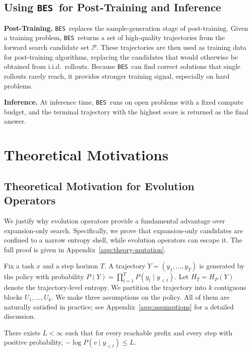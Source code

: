 \documentclass{llmxive}
\providecommand{\ours}{\texttt{BES}}
\begin{document}
\subsection{Using \ours\ for Post-Training and Inference}
\label{sec:usage}

\textbf{Post-Training.}
\ours\ replaces the sample-generation stage of post-training. Given a training problem, \ours\ returns a set of high-quality trajectories from the forward search candidate set $\mathcal{P}$. These trajectories are then used as training data for post-training algorithms, replacing the candidates that would otherwise be obtained from i.i.d.\ rollouts.
Because \ours\ can find correct solutions that single rollouts
rarely reach, it provides stronger training signal, especially
on hard problems.

\textbf{Inference.}
At inference time, \ours\ runs on open problems with a
fixed compute budget, and the terminal trajectory with the
highest score is returned as the final answer. 
\section{Theoretical Motivations}

\subsection{Theoretical Motivation for Evolution Operators}
\label{sec:theory-mutation}

We justify why evolution operators provide a fundamental advantage over expansion-only search. Specifically, we prove that expansion-only candidates are confined to a narrow entropy shell, while evolution operators can escape it. The full proof is given in Appendix~\ref{app:theory-mutation}.

Fix a task $x$ and a step horizon $T$. A trajectory $Y = (y_1, \dots, y_T)$ is generated by the policy with probability $P(Y) = \prod_{t=1}^T P(y_t \mid y_{<t})$. Let $H_T = H_P(Y)$ denote the trajectory-level entropy. We partition the trajectory into $k$ contiguous blocks $U_1, \dots, U_k$. We make three assumptions on the policy. All of them are naturally satisfied in practice; see Appendix~\ref{app:assumptions} for a detailed discussion.

\begin{assumption}
\label{assump:bounded}
There exists $L<\infty$ such that for every reachable prefix and every step with positive probability, $-\log P(v\mid y_{<t})\le L$.
\end{assumption}
\end{document}
